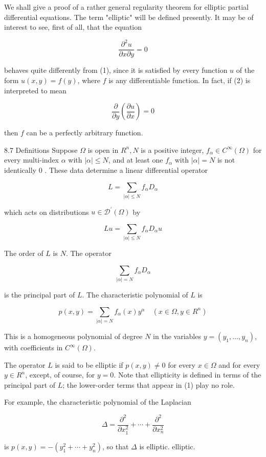 \documentclass[10pt]{article}
\begin{document}
We shall give a proof of a rather general regularity theorem for elliptic partial differential equations. The term "elliptic" will be defined presently. It may be of interest to see, first of all, that the equation

$$
\frac{\partial^{2} u}{\partial x \partial y}=0
$$

behaves quite differently from (1), since it is satisfied by every function $u$ of the form $u(x, y)=f(y)$, where $f$ is any differentiable function. In fact, if (2) is interpreted to mean

$$
\frac{\partial}{\partial y}\left(\frac{\partial u}{\partial x}\right)=0
$$

then $f$ can be a perfectly arbitrary function.

8.7 Definitions Suppose $\Omega$ is open in $R^{n}, N$ is a positive integer, $f_{\alpha} \in C^{\infty}(\Omega)$ for every multi-index $\alpha$ with $|\alpha| \leq N$, and at least one $f_{\alpha}$ with $|\alpha|=N$ is not identically 0 . These data determine a linear differential operator

$$
L=\sum_{|\alpha| \leq N} f_{\alpha} D_{\alpha}
$$

which acts on distributions $u \in \mathscr{D}^{\prime}(\Omega)$ by

$$
L u=\sum_{|\alpha| \leq N} f_{\alpha} D_{\alpha} u
$$

The order of $L$ is $N$. The operator

$$
\sum_{|\alpha|=N} f_{\alpha} D_{\alpha}
$$

is the principal part of $L$. The characteristic polynomial of $L$ is

$$
p(x, y)=\sum_{|\alpha|=N} f_{\alpha}(x) y^{\alpha} \quad\left(x \in \Omega, y \in R^{n}\right)
$$

This is a homogeneous polynomial of degree $N$ in the variables $y=\left(y_{1}, \ldots, y_{n}\right)$, with coefficients in $C^{\infty}(\Omega)$.

The operator $L$ is said to be elliptic if $p(x, y) \neq 0$ for every $x \in \Omega$ and for every $y \in R^{n}$, except, of course, for $y=0$. Note that ellipticity is defined in terms of the principal part of $L$; the lower-order terms that appear in (1) play no role.

For example, the characteristic polynomial of the Laplacian

$$
\Delta=\frac{\partial^{2}}{\partial x_{1}^{2}}+\cdots+\frac{\partial^{2}}{\partial x_{n}^{2}}
$$

is $p(x, y)=-\left(y_{1}^{2}+\cdots+y_{n}^{2}\right)$, so that $\Delta$ is elliptic. elliptic.
\end{document}
